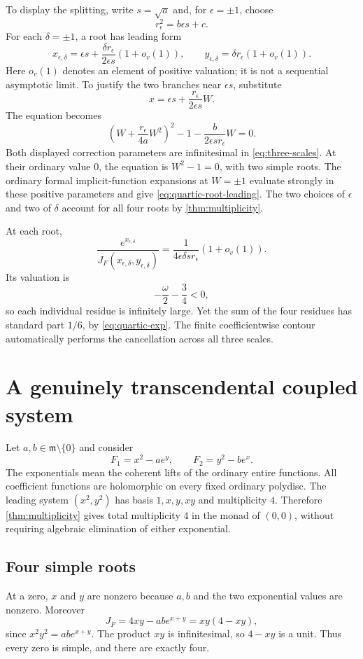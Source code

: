 \documentclass[11pt,letterpaper]{article}
\theoremstyle{definition}
\theoremstyle{remark}
\newcommand{\mm}{\mathfrak m}
\numberwithin{equation}{section}
\begin{document}
To display the splitting, write $s=\sqrt a$ and, for $\epsilon=\pm1$, choose
\[
 r_\epsilon^2=b\epsilon s+c.
\]
For each $\delta=\pm1$, a root has leading form
\begin{equation}\label{eq:quartic-root-leading}
 x_{\epsilon,\delta}
 =\epsilon s+\frac{\delta r_\epsilon}{2\epsilon s}(1+o_v(1)),
 \qquad
 y_{\epsilon,\delta}=\delta r_\epsilon(1+o_v(1)).
\end{equation}
Here $o_v(1)$ denotes an element of positive valuation; it is not a sequential asymptotic limit. To justify the two branches near $\epsilon s$, substitute
\[
 x=\epsilon s+\frac{r_\epsilon}{2\epsilon s}W.
\]
The equation becomes
\[
 \left(W+\frac{r_\epsilon}{4a}W^2\right)^2
 -1-\frac b{2\epsilon s r_\epsilon}W=0.
\]
Both displayed correction parameters are infinitesimal in \eqref{eq:three-scales}. At their ordinary value $0$, the equation is $W^2-1=0$, with two simple roots. The ordinary formal implicit-function expansions at $W=\pm1$ evaluate strongly in these positive parameters and give \eqref{eq:quartic-root-leading}. The two choices of $\epsilon$ and two of $\delta$ account for all four roots by \cref{thm:multiplicity}.

At each root,
\[
 \frac{e^{x_{\epsilon,\delta}}}{J_F(x_{\epsilon,\delta},y_{\epsilon,\delta})}
 =\frac1{4\epsilon\delta s r_\epsilon}(1+o_v(1)).
\]
Its valuation is
\[
 -\frac{\omega}{2}-\frac34<0,
\]
so each individual residue is infinitely large. Yet the sum of the four residues has standard part $1/6$, by \eqref{eq:quartic-exp}. The finite coefficientwise contour automatically performs the cancellation across all three scales.

\section{A genuinely transcendental coupled system}\label{sec:transcendental}
Let $a,b\in\mm\setminus\{0\}$ and consider
\begin{equation}\label{eq:trans-system}
 F_1=x^2-ae^y,\qquad F_2=y^2-be^x.
\end{equation}
The exponentials mean the coherent lifts of the ordinary entire functions. All coefficient functions are holomorphic on every fixed ordinary polydisc. The leading system $(x^2,y^2)$ has basis $1,x,y,xy$ and multiplicity $4$. Therefore \cref{thm:multiplicity} gives total multiplicity $4$ in the monad of $(0,0)$, without requiring algebraic elimination of either exponential.

\subsection{Four simple roots}
At a zero, $x$ and $y$ are nonzero because $a,b$ and the two exponential values are nonzero. Moreover
\begin{equation}\label{eq:trans-jacobian}
 J_F=4xy-ab e^{x+y}=xy(4-xy),
\end{equation}
since $x^2y^2=ab e^{x+y}$. The product $xy$ is infinitesimal, so $4-xy$ is a unit. Thus every zero is simple, and there are exactly four.
\end{document}
